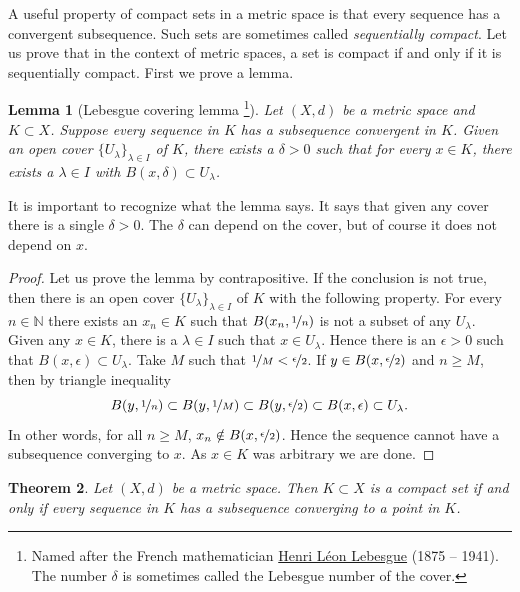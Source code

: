 \documentclass[12pt]{book}
\newcommand{\N}{{\mathbb{N}}}
\newcommand{\myindex}[1]{#1\index{#1}}
\theoremstyle{plain}
\newtheorem{thm}{Theorem}[section]
\newtheorem{lemma}[thm]{Lemma}
\theoremstyle{remark}
\theoremstyle{definition}
\theoremstyle{exercise}
\theoremstyle{example}
\begin{document}
A useful property of compact sets in a metric space is that every
sequence has a convergent subsequence.  Such sets are sometimes called
\emph{\myindex{sequentially compact}}.  Let us prove that in the
context of metric spaces, a set is compact if and only if it is sequentially
compact.
First we prove a lemma.

\begin{lemma}[Lebesgue covering lemma%
\footnote{Named after the French mathematician
\href{http://en.wikipedia.org/wiki/Lebesgue}{Henri L\'eon Lebesgue}
(1875 -- 1941).
The number $\delta$ is sometimes called the \myindex{Lebesgue number} of the
cover.}]\label{ms:lebesgue}
Let $(X,d)$ be a metric space and $K \subset X$.  Suppose 
every sequence in $K$ has a subsequence convergent in $K$.  Given
an open cover $\{ U_\lambda \}_{\lambda \in I}$ of $K$, there exists a
$\delta > 0$ such that for every $x \in K$, there exists a $\lambda \in I$
with $B(x,\delta) \subset U_\lambda$.
\end{lemma}

It is important to recognize what the lemma says.  It says that given any
cover there is a single $\delta > 0$.  The $\delta$ can depend on the cover,
but of course it does not depend on $x$.

\begin{proof}
Let us prove the lemma by contrapositive.
If the conclusion is not true, then
there is
an open cover $\{ U_\lambda \}_{\lambda \in I}$ of $K$ with
the following property.
For every $n \in \N$ there exists an $x_n \in K$ such that
$B(x_n,\nicefrac{1}{n})$ is not a subset of any $U_\lambda$.
Given any $x \in K$, there is
a $\lambda \in I$ such that $x \in U_\lambda$.  Hence there
is an $\epsilon > 0$ 
such that $B(x,\epsilon) \subset U_\lambda$.  Take $M$ such that
$\nicefrac{1}{M} < \nicefrac{\epsilon}{2}$.  If $y \in 
B(x,\nicefrac{\epsilon}{2})$ and $n \geq M$, then
by triangle inequality
\begin{equation*}
B(y,\nicefrac{1}{n}) \subset
B(y,\nicefrac{1}{M}) \subset B(y,\nicefrac{\epsilon}{2}) \subset
B(x,\epsilon) \subset U_\lambda .
\end{equation*}
In other words, for all $n \geq M$, $x_n \notin B(x,\nicefrac{\epsilon}{2})$. 
Hence the sequence cannot have a subsequence converging to $x$.  As $x \in K$ was
arbitrary we are done.
\end{proof}

\begin{thm} \label{thm:mscompactisseqcpt}
Let $(X,d)$ be a metric space.  Then $K \subset X$ is a compact set if
and only if every sequence in $K$ has a subsequence converging to
a point in $K$.
\end{thm}
\end{document}
